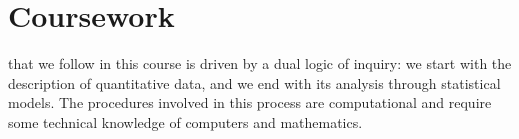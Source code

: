 %
%
\section{Coursework}%

 that we follow in this course is driven by a dual logic of inquiry: we start with the description of quantitative data, and we end with its analysis through statistical models. The procedures involved in this process are computational and require some technical knowledge of computers and mathematics.%












